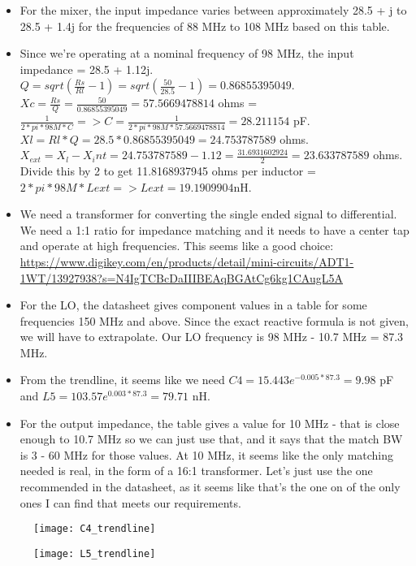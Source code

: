\documentclass[12pt, letterpaper]{article}
\begin{document}
\begin{itemize}
    \item For the mixer, the input impedance varies between approximately 28.5 + j to 28.5 + 1.4j for the frequencies of 88 MHz to 108 MHz based on this table. 
    \item Since we're operating at a nominal frequency of 98 MHz, the input impedance = 28.5 + 1.12j. \(Q = sqrt(\frac{Rs}{Rl} - 1) = sqrt(\frac{50}{28.5} - 1) = 0.86855395049\). \(Xc = \frac{Rs}{Q} = \frac{50}{0.86855395049} = 57.5669478814 \) ohms = \( \frac{1}{2*pi*98M*C} => C = \frac{1}{2*pi*98M*57.5669478814} = 28.211154 \) pF. \( Xl = Rl*Q = 28.5*0.86855395049 = 24.753787589 \) ohms. \( X_{ext} = X_l - X_int = 24.753787589 - 1.12 = \frac{31.6931602924}{2} = 23.633787589 \) ohms. Divide this by 2 to get 11.8168937945 ohms per inductor = \(2*pi*98M*Lext => Lext = 19.1909904 \)nH.
    \item We need a transformer for converting the single ended signal to differential. We need a 1:1 ratio for impedance matching and it needs to have a center tap and operate at high frequencies. This seems like a good choice: \url{https://www.digikey.com/en/products/detail/mini-circuits/ADT1-1WT/13927938?s=N4IgTCBcDaIIIBEAqBGAtCg6kg1CAugL5A}
    \item For the LO, the datasheet gives component values in a table for some frequencies 150 MHz and above. Since the exact reactive formula is not given, we will have to extrapolate. Our LO frequency is 98 MHz - 10.7 MHz = 87.3 MHz.
    \item From the trendline, it seems like we need \(C4 = 15.443e^{-0.005*87.3} = 9.98\) pF and \(L5 = 103.57e^{0.003*87.3} = 79.71\) nH. 
    \item For the output impedance, the table gives a value for 10 MHz - that is close enough to 10.7 MHz so we can just use that, and it says that the match BW is 3 - 60 MHz for those values. At 10 MHz, it seems like the only matching needed is real, in the form of a 16:1 transformer. Let's just use the one recommended in the datasheet, as it seems like that's the one on of the only ones I can find that meets our requirements.

\end{itemize}

\begin{figure}[h]
    \texttt{[image: C4\_trendline]}
\end{figure}

\begin{figure}[h]
    \texttt{[image: L5\_trendline]}
\end{figure}
\end{document}

